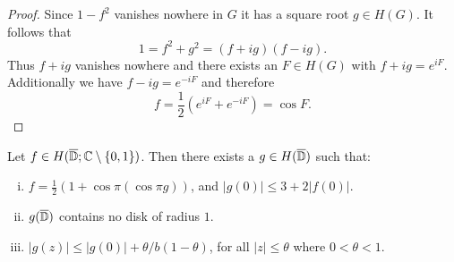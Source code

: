 \begin{proof}
    Since $1 - f^2$ vanishes nowhere in $G$ it has a square root $g \in H(G)$. It follows that
    $$ 1 = f^2 + g^2 = (f + ig)(f - ig). $$
    Thus $f + ig$ vanishes nowhere and there exists an $F \in H(G)$ with $f + ig = e^{iF}$. Additionally we have $f - ig = e^{-iF}$ and therefore
    $$ f = {\textstyle \frac{1}{2}} (e^{iF} + e^{-iF}) = \cos F. $$
\end{proof}

\begin{lemma} \label{lem:schottky-3}
    Let $f \in H(\overline{\mathbb{D}}; \mathbb{C} \setminus \{ 0, 1 \})$. Then there exists a $g \in H(\overline{\mathbb{D}})$ such that:
    \begin{enumerate}[i.]
        \item $f = \frac{1}{2} ( 1 + \cos \pi (\cos \pi g))$, and $\vert g(0) \vert \leq 3 + 2 \vert f(0) \vert$.
        \item $g(\overline{\mathbb{D}})$ contains no disk of radius $1$.
        \item $\vert g(z) \vert \leq \vert g(0) \vert + \theta / b (1 - \theta)$, for all $\vert z \vert \leq \theta$ where $0 < \theta < 1$.
    \end{enumerate}
\end{lemma}

